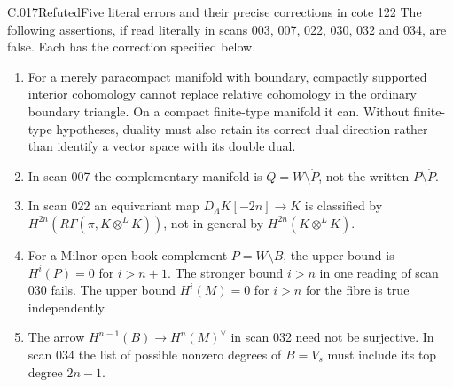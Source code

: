 \begin{saresult}{C.017}{Refuted}{Five literal errors and their precise corrections in cote 122}
The following assertions, if read literally in scans 003, 007, 022,
030, 032 and 034, are false. Each has the correction specified below.
\begin{enumerate}
\item For a merely paracompact manifold with boundary, compactly
supported interior cohomology cannot replace relative cohomology in
the ordinary boundary triangle. On a compact finite-type manifold it
can. Without finite-type hypotheses, duality must also retain its
correct dual direction rather than identify a vector space with its
double dual.
\item In scan 007 the complementary manifold is
$Q=W\setminus\mathring P$, not the written $P\setminus\mathring P$.
\item In scan 022 an equivariant map
$D_\Lambda K[-2n]\to K$ is classified by
$H^{2n}(R\Gamma(\pi,K\otimes^L K))$, not in general by
$H^{2n}(K\otimes^L K)$.
\item For a Milnor open-book complement $P=W\setminus B$, the upper
bound is $H^i(P)=0$ for $i>n+1$. The stronger bound $i>n$ in one
reading of scan 030 fails. The upper bound $H^i(M)=0$ for $i>n$
for the fibre is true independently.
\item The arrow $H^{n-1}(B)\to H^n(M)^\vee$ in scan 032 need not
be surjective. In scan 034 the list of possible nonzero degrees of
$B=V_s$ must include its top degree $2n-1$.
\end{enumerate}
\end{saresult}
